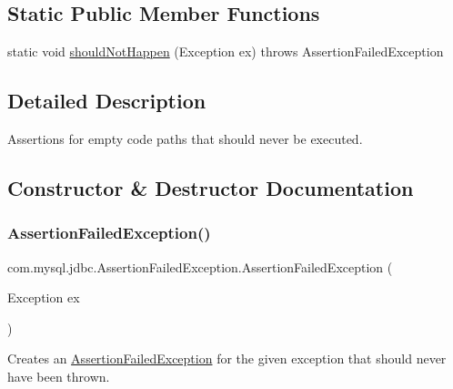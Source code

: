 \subsection*{Static Public Member Functions}
\begin{DoxyCompactItemize}
\item 
static void \mbox{\hyperlink{classcom_1_1mysql_1_1jdbc_1_1_assertion_failed_exception_a2477a2df55a2af9c8e127fc9a8a0fc34}{should\+Not\+Happen}} (Exception ex)  throws Assertion\+Failed\+Exception 
\end{DoxyCompactItemize}


\subsection{Detailed Description}
Assertions for empty code paths that should never be executed. 

\subsection{Constructor \& Destructor Documentation}
\mbox{\label{classcom_1_1mysql_1_1jdbc_1_1_assertion_failed_exception_a4e3aad4529bc6d57c1c58d52defe4cb8}} 
\subsubsection{\texorpdfstring{Assertion\+Failed\+Exception()}{AssertionFailedException()}}
{\footnotesize\ttfamily com.\+mysql.\+jdbc.\+Assertion\+Failed\+Exception.\+Assertion\+Failed\+Exception (\begin{DoxyParamCaption}\item[{Exception}]{ex }\end{DoxyParamCaption})}

Creates an \mbox{\hyperlink{classcom_1_1mysql_1_1jdbc_1_1_assertion_failed_exception}{Assertion\+Failed\+Exception}} for the given exception that should never have been thrown.


